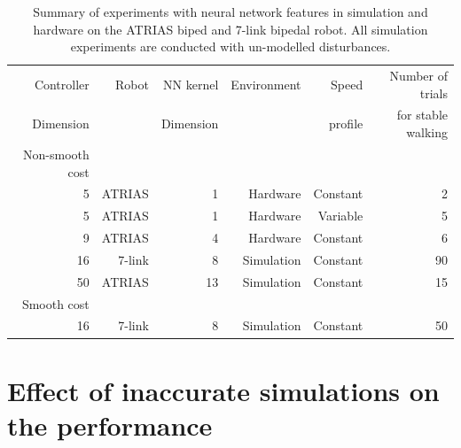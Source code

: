 \begin{table}[h!]
\centering
{}
\small{
\begin{tabular}{@{}rrrrrr@{}} 
\toprule
Controller & Robot & NN kernel & Environment & Speed & Number of trials \\
Dimension &        & Dimension &              & profile & for stable walking \\

\midrule

Non-smooth cost \\

5 & ATRIAS & 1 & Hardware & Constant & 2 \\

5 & ATRIAS & 1 & Hardware & Variable & 5 \\

9 & ATRIAS & 4 & Hardware & Constant & 6 \\

16 & 7-link &8 & Simulation & Constant & 90 \\

50 & ATRIAS &13 & Simulation & Constant & 15 \\

Smooth cost \\

16 & 7-link & 8 & Simulation & Constant & 50 \\

\bottomrule
\end{tabular}
}
\caption{Summary of experiments with neural network features in simulation and hardware on the ATRIAS biped and 7-link bipedal robot. All simulation experiments are conducted with un-modelled disturbances.}
\label{tbl:nn_expts_details}
\end{table}

\section{Effect of inaccurate simulations on the performance}

\label{subsec:mismatch_experiments}


